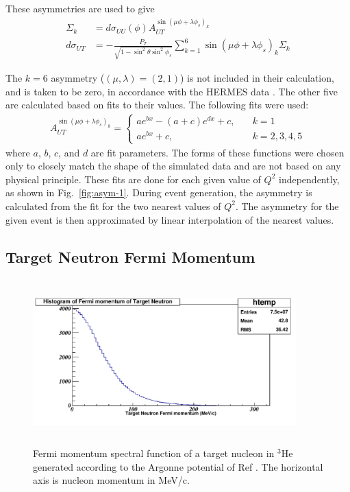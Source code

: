 These asymmetries are used to give
\begin{align}
  \Sigma_k &= d\sigma_{UU}(\phi)A_{UT}^{\sin(\mu\phi+\lambda\phi_s)_k} \\
  d\sigma_{UT}&=-\frac{P_T}{\sqrt{1-\sin^2\theta
      \sin^2\phi_s}}\sum_{k=1}^{6}\sin(\mu\phi+\lambda\phi_s)_k\Sigma_k
\end{align}

The $k=6$ asymmetry ($(\mu,\lambda)=(2,1)$) is not included in their
calculation, and is taken to be zero, in accordance with the HERMES data
\cite{hermes-thesis}. The other five are calculated based on fits to their
values.  The following fits were used:
\begin{align}
  A_{UT}^{\sin(\mu\phi+\lambda\phi_s)_k} =
  \begin{cases}
    ae^{bx}-(a+c)e^{dx}+c, &\quad k=1 \\
    ae^{bx}+c, &\quad k=2,3,4,5
  \end{cases}
\end{align}
where $a$, $b$, $c$, and $d$ are fit parameters. The forms of these functions
were chosen only to closely match the shape of the simulated data and are not
based on any physical principle. These fits are done for each given value of
$Q^2$ independently, as shown in Fig.~\ref{fig:asym-1}.  During event
generation, the asymmetry is calculated from the fit for the two nearest values
of $Q^2$. The asymmetry for the given event is then approximated by linear
interpolation of the nearest values.

\subsection{Target Neutron Fermi Momentum 
\label{sec:fermimotion}}

\begin{figure}[!hbt]
    \centering
    \includegraphics[width=4.0in,height=2.5in]{./figures/Fermi.pdf}
    \caption{Fermi momentum spectral function of a target nucleon in $^3$He
      generated according to the Argonne potential of Ref \cite{fermipaper}.
      The horizontal axis is nucleon momentum in MeV/c.}
    \label{fig:fermi}
\end{figure}

